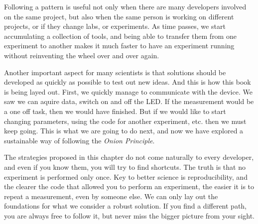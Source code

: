 Following a pattern is useful not only when there are many developers involved on the same project, but also when the same person is working on different projects, or if they change labs, or experiments. As time passes, we start accumulating a collection of tools, and being able to transfer them from one experiment to another makes it much faster to have an experiment running without reinventing the wheel over and over again.

Another important aspect for many scientists is that solutions should be developed as quickly as possible to test out new ideas. And this is how this book is being layed out. First, we quickly manage to communicate with the device. We saw we can aquire data, switch on and off the LED. If the measurement would be a one off task, then we would have finished. But if we would like to start changing parameters, using the code for another experiment, etc. then we must keep going. This is what we are going to do next, and now we have explored a sustainable way of following the \emph{Onion Principle}.

The strategies proposed in this chapter do not come naturally to every developer, and even if you know them, you will try to find shortcuts. The truth is that no experiment is performed only once. Key to better science is reproducibility, and the clearer the code that allowed you to perform an experiment, the easier it is to repeat a measurement, even by someone else. We can only lay out the foundations for what we consider a robust solution. If you find a different path, you are always free to follow it, but never miss the bigger picture from your sight.
